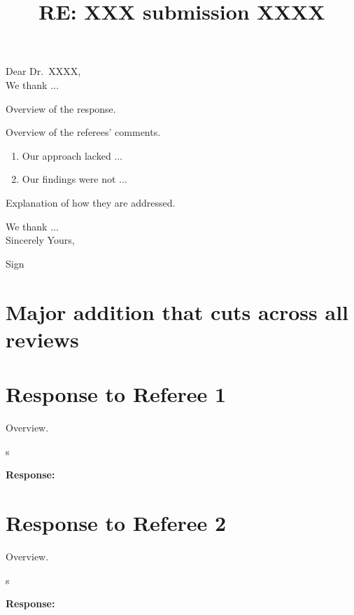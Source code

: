 \documentclass[12pt]{article}
\title{RE: XXX submission XXXX}
\date{}
\makeatletter
\newcommand{\response}[1]{{\noindent \textbf{Response:} \\ \noindent #1}}
\newcommand{\rcomment}[1]{%
\vspace{10pt}
\begin{sectionbox}
s #1
\end{sectionbox}
}
\renewcommand{\maketitle}{\bgroup\setlength{\parindent}{0pt}
\begin{flushleft}
\Large  \textbf{\@title}
\end{flushleft}\egroup
}
\makeatother
\begin{document}
\maketitle

\bigskip
\noindent Dear Dr.~XXXX, \\

We thank $\dots$ 

Overview of the response.

Overview of the referees' comments.

\begin{enumerate}
    \itemsep0em
    \item Our approach lacked $\dots$ 
    \item Our findings were not $\dots$ 
\end{enumerate}

Explanation of how they are addressed. 

We thank $\dots$ \\

Sincerely Yours,

Sign


\clearpage
\tableofcontents
\clearpage


\section{Major addition that cuts across all reviews}\label{sec:major}

\lipsum[1]{} 


%
%
\clearpage
\section{Response to Referee 1}

Overview. 

\rcomment{%
\lipsum[1]{} 
}

\response{%
\lipsum[1]{}
}

%
%
\clearpage
\section{Response to Referee 2}

Overview. 

\rcomment{%
\lipsum[1]{} 
}

\response{%
\lipsum[1]{}
}

%
%
\clearpage
\printbibliography{}
\end{document}
